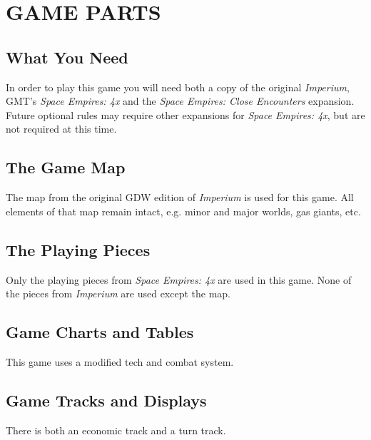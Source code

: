\section{GAME PARTS}

\subsection{What You Need}

In order to play this game you will need both a copy of the original \textit{Imperium}, GMT's \textit{Space Empires: 4x} and the \textit{Space Empires: Close Encounters} expansion. Future optional rules may require other expansions for \textit{Space Empires: 4x}, but are not required at this time.

\subsection{The Game Map}

The map from the original GDW edition of \textit{Imperium} is used for this game. All elements of that map remain intact, e.g. minor and major worlds, gas giants, etc.

\subsection{The Playing Pieces}

Only the playing pieces from \textit{Space Empires: 4x} are used in this game. None of the pieces from \textit{Imperium} are used except the map.

\subsection{Game Charts and Tables}

This game uses a modified tech and combat system.

\subsection{Game Tracks and Displays}

There is both an economic track and a turn track.